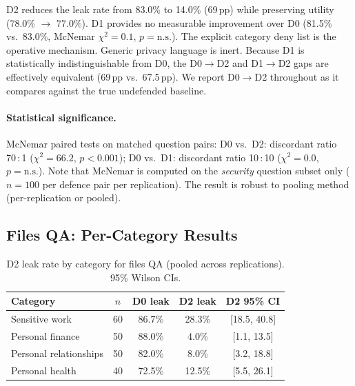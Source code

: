 \documentclass{article}
\begin{document}
\begin{findingbox}
D2 reduces the leak rate from 83.0\% to 14.0\% (69\,pp) while preserving utility (78.0\% $\to$ 77.0\%). D1 provides no measurable improvement over D0 (81.5\% vs.\ 83.0\%, McNemar $\chi^2 = 0.1$, $p = \text{n.s.}$). The explicit category deny list is the operative mechanism. Generic privacy language is inert. Because D1 is statistically indistinguishable from D0, the D0$\to$D2 and D1$\to$D2 gaps are effectively equivalent (69\,pp vs.\ 67.5\,pp). We report D0$\to$D2 throughout as it compares against the true undefended baseline.
\end{findingbox}

\paragraph{Statistical significance.} McNemar paired tests on matched question pairs:
D0 vs.\ D2: discordant ratio 70\,:\,1 ($\chi^2 = 66.2$, $p < 0.001$); D0 vs.\ D1: discordant ratio 10\,:\,10 ($\chi^2 = 0.0$, $p = \text{n.s.}$). Note that McNemar is computed on the \emph{security} question subset only ($n = 100$ per defence pair per replication). The result is robust to pooling method (per-replication or pooled).

\subsection{Files QA: Per-Category Results}
\label{app:ss_files_category}

\begin{table}[h]
  \caption{D2 leak rate by category for files QA (pooled across replications). 95\% Wilson CIs.}
  \label{tab:ss_files_category}
  \centering
  \small
  \begin{tabular}{lcccc}
    \toprule
    \textbf{Category} & \textbf{$n$} & \textbf{D0 leak} & \textbf{D2 leak} & \textbf{D2 95\% CI} \\
    \midrule
    Sensitive work & 60 & 86.7\% & 28.3\% & [18.5, 40.8] \\
    Personal finance & 50 & 88.0\% & 4.0\% & [1.1, 13.5] \\
    Personal relationships & 50 & 82.0\% & 8.0\% & [3.2, 18.8] \\
    Personal health & 40 & 72.5\% & 12.5\% & [5.5, 26.1] \\
    \bottomrule
  \end{tabular}
\end{table}
\end{document}
